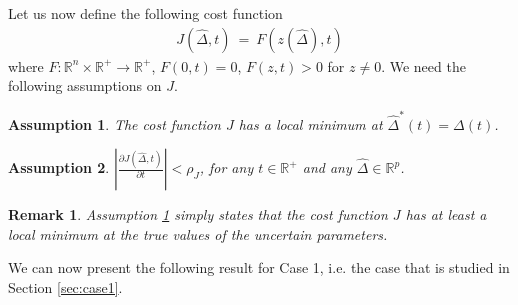 \documentclass[twoside,leqno,onecolumn]{article}
\newtheorem{assumption}{Assumption}
\newtheorem{remark}{Remark}
\begin{document}
Let us now define the following cost function
\begin{align}
\label{eq:cost_gen}
J(\widehat{\Delta},t)~=~F(z(\widehat{\Delta}),t)
\end{align}
where $F:\mathbb{R}^{n}\times \mathbb{R}^+\rightarrow
\mathbb{R}^+$, $F(0,t) = 0$, $F(z,t)>0$ for $z\neq 0$. We need the
following assumptions on $J$.

\begin{assumption}
\label{asp:cost} The cost function $J$ has a local minimum at
$\widehat{\Delta}^*(t) = \Delta(t)$.
\end{assumption}

\begin{assumption}
\label{asp:Lips} $|\frac{\partial J (\widehat{\Delta},t)}{\partial
t}|<\rho_J$, for any $t\in\mathbb{R}^+$ and any
$\widehat{\Delta}\in\mathbb{R}^p$.
\end{assumption}

\begin{remark}
Assumption \ref{asp:cost} simply states that the cost function $J$
has at least a local minimum at the true values of the uncertain
parameters.
\end{remark}

We can now present the following result for Case 1, i.e. the case
that is studied in Section \ref{sec:case1}.
\end{document}
